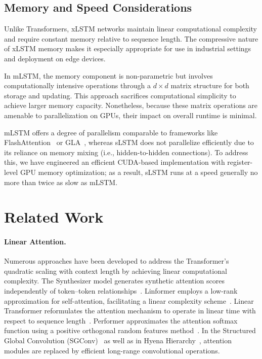 \subsection{Memory and Speed Considerations}

Unlike Transformers, xLSTM networks maintain linear computational complexity and require constant memory relative to sequence length. The compressive nature of xLSTM memory makes it especially appropriate for use in industrial settings and deployment on edge devices.

In mLSTM, the memory component is non-parametric but involves computationally intensive operations through a $d \times d$ matrix structure for both storage and updating. This approach sacrifices computational simplicity to achieve larger memory capacity. Nonetheless, because these matrix operations are amenable to parallelization on GPUs, their impact on overall runtime is minimal.

mLSTM offers a degree of parallelism comparable to frameworks like FlashAttention~\citep{Dao:22,Dao:23} or GLA~\citep{Yang:23arxiv}, whereas sLSTM does not parallelize efficiently due to its reliance on memory mixing (i.e., hidden-to-hidden connections). To address this, we have engineered an efficient CUDA-based implementation with register-level GPU memory optimization; as a result, sLSTM runs at a speed generally no more than twice as slow as mLSTM.

\section{Related Work}
\label{sec:related}

\paragraph{Linear Attention.} Numerous approaches have been developed to address the Transformer’s quadratic scaling with context length by achieving linear computational complexity. The Synthesizer model generates synthetic attention scores independently of token--token relationships~\citep{Tay:20arxiv}. Linformer employs a low-rank approximation for self-attention, facilitating a linear complexity scheme~\citep{Wang:20arxiv}. Linear Transformer reformulates the attention mechanism to operate in linear time with respect to sequence length~\citep{Katharopoulos:20}. Performer approximates the attention softmax function using a positive orthogonal random features method~\citep{Choromanski:21}. In the Structured Global Convolution (SGConv)~\citep{Li:22} as well as in Hyena Hierarchy~\citep{Poli:23}, attention modules are replaced by efficient long-range convolutional operations.

